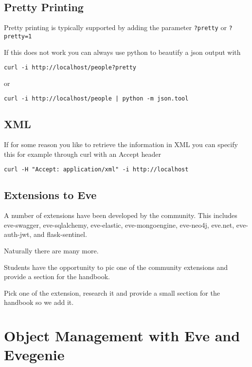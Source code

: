 \subsection{Pretty Printing}

Pretty printing is typically supported by adding the parameter
\verb|?pretty| or \verb|?pretty=1|

If this does not work you can always use python to beautify a json
output with 

\begin{lstlisting}
curl -i http://localhost/people?pretty
\end{lstlisting}

or

\begin{lstlisting}
curl -i http://localhost/people | python -m json.tool
\end{lstlisting}

\subsection{XML}

If for some reason you like to retrieve the information in XML you can
specify this for example through curl with an Accept header

\begin{lstlisting}
curl -H "Accept: application/xml" -i http://localhost
\end{lstlisting}


\subsection{Extensions to Eve}

A number of extensions have been developed by the community. This
includes
eve-swagger,
eve-sqlalchemy,
eve-elastic,
eve-mongoengine,
eve-neo4j,
eve.net,
eve-auth-jwt, and
flask-sentinel.

Naturally there are many more.

Students have the opportunity to pic one of the community extensions
and provide a section for the handbook.

\begin{exercise}
Pick one of the extension, research it and provide a small section for
the handbook so we add it.
\end{exercise}

\section{Object Management with Eve and Evegenie}


